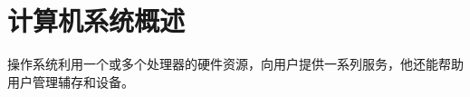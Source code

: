 
\chapter{计算机系统概述}
{
    操作系统利用一个或多个处理器的硬件资源，向用户提供一系列服务，他还能帮助用户管理辅存和设备。

    
}

\cleardoublepage

\endinput
